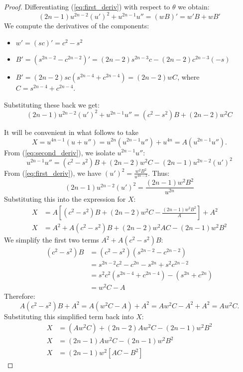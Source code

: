 \documentclass{amsart}
\theoremstyle{definition}
\begin{document}
\begin{proof}
Differentiating (\ref{eq:first_deriv}) with respect to $\theta$ we obtain:
\begin{equation}
(2n-1)u^{2n-2}(u')^2 + u^{2n-1}u'' = (wB)' = w'B + wB'
\end{equation}
We compute the derivatives of the components:
\begin{itemize}
    \item $w' = (sc)' = c^2 - s^2$
    \item $B' = (s^{2n-2} - c^{2n-2})' = (2n-2)s^{2n-3}c - (2n-2)c^{2n-3}(-s)$
    \item $B' = (2n-2)sc(s^{2n-4} + c^{2n-4}) = (2n-2)w C$, where $C = s^{2n-4} + c^{2n-4}$.
\end{itemize}
Substituting these back we get:
\begin{equation}
(2n-1)u^{2n-2}(u')^2 + u^{2n-1}u'' = (c^2-s^2)B + (2n-2)w^2 C \label{eq:second_deriv}
\end{equation}

It will be convenient in what follows to take 
\[X = u^{4n-1}(u+u'') = u^{2n}(u^{2n-1}u'') + u^{4n}=A(u^{2n-1}u'').\]
From (\ref{eq:second_deriv}), we isolate $u^{2n-1}u''$:
$$ u^{2n-1}u'' = (c^2-s^2)B + (2n-2)w^2 C - (2n-1)u^{2n-2}(u')^2 $$
From (\ref{eq:first_deriv}), we have $(u')^2 = \frac{w^2 B^2}{u^{4n-2}}$.
Thus:
$$ (2n-1)u^{2n-2}(u')^2 = \frac{(2n-1)w^2 B^2}{u^{2n}} $$
Substituting this into the expression for $X$:
\begin{align*}
X &= A \left[ (c^2-s^2)B + (2n-2)w^2 C - \frac{(2n-1)w^2 B^2}{A} \right] + A^2 \\
X &= A^2+A(c^2-s^2)B + (2n-2)w^2 AC - (2n-1)w^2 B^2
\end{align*}
We simplify the first two terms $A^2+A(c^2-s^2)B$:
\begin{align*}
(c^2-s^2)B &= (c^2-s^2)(s^{2n-2}-c^{2n-2}) \\
&= s^{2n-2}c^2 - c^{2n} - s^{2n} + s^2c^{2n-2} \\
&= s^2c^2(s^{2n-4} + c^{2n-4}) - (s^{2n} + c^{2n}) \\
&= w^2 C - A
\end{align*}
Therefore:
\[A(c^2-s^2)B + A^2 = A(w^2 C - A) + A^2 = A w^2 C - A^2 + A^2 = A w^2 C.\]
Substituting this simplified term back into $X$:
\begin{align*}
X &= (A w^2 C) + (2n-2)A w^2 C - (2n-1)w^2 B^2 \\
X &= (2n-1) A w^2 C - (2n-1) w^2 B^2 \\
X &= (2n-1) w^2 [ AC - B^2 ]
\end{align*}


\end{proof}
\end{document}
